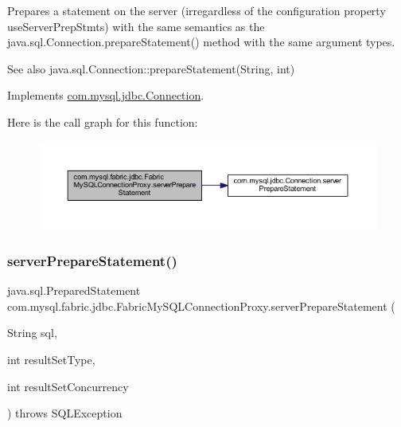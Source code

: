 Prepares a statement on the server (irregardless of the configuration property \textquotesingle{}use\+Server\+Prep\+Stmts\textquotesingle{}) with the same semantics as the java.\+sql.\+Connection.\+prepare\+Statement() method with the same argument types.

\begin{DoxySeeAlso}{See also}
java.\+sql.\+Connection\+::prepare\+Statement(\+String, int) 
\end{DoxySeeAlso}


Implements \mbox{\hyperlink{interfacecom_1_1mysql_1_1jdbc_1_1_connection_ab063bf6d934fba06ba65eaa68aa06ef6}{com.\+mysql.\+jdbc.\+Connection}}.

Here is the call graph for this function\+:\nopagebreak
\begin{figure}[H]
\begin{center}
\leavevmode
\includegraphics[width=350pt]{classcom_1_1mysql_1_1fabric_1_1jdbc_1_1_fabric_my_s_q_l_connection_proxy_a6c9996b3e5be5aaab5f249429275a214_cgraph}
\end{center}
\end{figure}
\mbox{\label{classcom_1_1mysql_1_1fabric_1_1jdbc_1_1_fabric_my_s_q_l_connection_proxy_a10da05d178dc0a7d035a65c68996c48c}} 
\subsubsection{\texorpdfstring{server\+Prepare\+Statement()}{serverPrepareStatement()}\hspace{0.1cm}{\footnotesize\ttfamily [3/6]}}
{\footnotesize\ttfamily java.\+sql.\+Prepared\+Statement com.\+mysql.\+fabric.\+jdbc.\+Fabric\+My\+S\+Q\+L\+Connection\+Proxy.\+server\+Prepare\+Statement (\begin{DoxyParamCaption}\item[{String}]{sql,  }\item[{int}]{result\+Set\+Type,  }\item[{int}]{result\+Set\+Concurrency }\end{DoxyParamCaption}) throws S\+Q\+L\+Exception}

